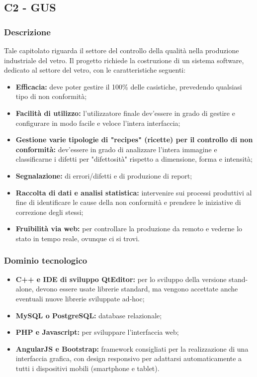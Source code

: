  
\subsection{C2 - GUS}

\subsubsection{Descrizione}
Tale capitolato riguarda il settore del controllo della qualità nella produzione industriale del vetro.
Il progetto richiede la costruzione di un sistema software, dedicato al settore del vetro, con le caratteristiche seguenti:

\begin{itemize}
\item \textbf{Efficacia:} deve poter gestire il 100\% delle casistiche, prevedendo qualsiasi tipo di non conformità;
\item \textbf{Facilità di utilizzo:} l'utilizzatore finale dev'essere in grado di gestire e configurare in modo facile e veloce l'intera interfaccia;
\item \textbf{Gestione varie tipologie di "recipes" (ricette) per il controllo di non conformità:} dev'essere in grado di analizzare l'intera immagine e classificarne i difetti per "difettosità" rispetto a dimensione, forma e intensità;
\item \textbf{Segnalazione:} di errori/difetti e di produzione di report;
\item \textbf{Raccolta di dati e analisi statistica:} intervenire sui processi produttivi al fine di identificare le cause della non conformità e prendere le 
iniziative di correzione degli stessi;
\item \textbf{Fruibilità via web:} per controllare la produzione da remoto e vederne lo stato in tempo reale, ovunque ci si trovi.
\end{itemize}

\subsubsection{Dominio tecnologico}

\begin{itemize}
\item \textbf{C++ e IDE di sviluppo QtEditor:} per lo sviluppo della versione stand-alone, devono essere usate librerie standard, ma vengono accettate anche eventuali nuove librerie sviluppate ad-hoc;
\item \textbf{MySQL o PostgreSQL:} database relazionale;
\item \textbf{PHP e Javascript:} per sviluppare l'interfaccia web;
\item \textbf{AngularJS e Bootstrap:} framework consigliati per la realizzazione di una interfaccia grafica, con design responsivo per adattarsi
automaticamente a tutti i dispositivi mobili (smartphone e tablet).
\end{itemize}

